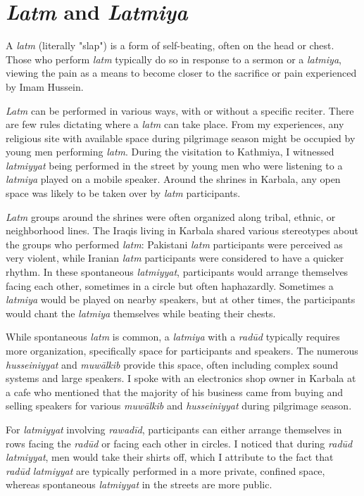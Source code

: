\section{\emph{Latm} and \emph{Latmiya}}

A \emph{latm} (literally "slap") is a form of self-beating, often on the head or chest. Those who perform \emph{latm} typically do so in response to a sermon or a \emph{latmiya}, viewing the pain as a means to become closer to the sacrifice or pain experienced by Imam Hussein.

\emph{Latm} can be performed in various ways, with or without a specific reciter. There are few rules dictating where a \emph{latm} can take place. From my experiences, any religious site with available space during pilgrimage season might be occupied by young men performing \emph{latm}. During the visitation to Kathmiya, I witnessed \emph{latmiyyat} being performed in the street by young men who were listening to a \emph{latmiya} played on a mobile speaker. Around the shrines in Karbala, any open space was likely to be taken over by \emph{latm} participants.

\emph{Latm} groups around the shrines were often organized along tribal, ethnic, or neighborhood lines. The Iraqis living in Karbala shared various stereotypes about the groups who performed \emph{latm}: Pakistani \emph{latm} participants were perceived as very violent, while Iranian \emph{latm} participants were considered to have a quicker rhythm. In these spontaneous \emph{latmiyyat}, participants would arrange themselves facing each other, sometimes in a circle but often haphazardly. Sometimes a \emph{latmiya} would be played on nearby speakers, but at other times, the participants would chant the \emph{latmiya} themselves while beating their chests.

While spontaneous \emph{latm} is common, a \emph{latmiya} with a \emph{radūd} typically requires more organization, specifically space for participants and speakers. The numerous \emph{husseiniyyat} and \emph{muwālkib} provide this space, often including complex sound systems and large speakers. I spoke with an electronics shop owner in Karbala at a cafe who mentioned that the majority of his business came from buying and selling speakers for various \emph{muwālkib} and \emph{husseiniyyat} during pilgrimage season.

For \emph{latmiyyat} involving \emph{rawadīd}, participants can either arrange themselves in rows facing the \emph{radūd} or facing each other in circles. I noticed that during \emph{radūd} \emph{latmiyyat}, men would take their shirts off, which I attribute to the fact that \emph{radūd} \emph{latmiyyat} are typically performed in a more private, confined space, whereas spontaneous \emph{latmiyyat} in the streets are more public.

